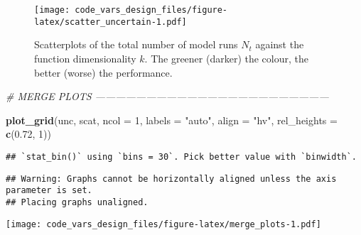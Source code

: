 \documentclass[11pt,]{article}
\newenvironment{Shaded}{\begin{snugshade}}{\end{snugshade}}
\newcommand{\CommentTok}[1]{\textcolor[rgb]{0.56,0.35,0.01}{\textit{#1}}}
\newcommand{\DataTypeTok}[1]{\textcolor[rgb]{0.13,0.29,0.53}{#1}}
\newcommand{\DecValTok}[1]{\textcolor[rgb]{0.00,0.00,0.81}{#1}}
\newcommand{\FloatTok}[1]{\textcolor[rgb]{0.00,0.00,0.81}{#1}}
\newcommand{\KeywordTok}[1]{\textcolor[rgb]{0.13,0.29,0.53}{\textbf{#1}}}
\newcommand{\NormalTok}[1]{#1}
\newcommand{\StringTok}[1]{\textcolor[rgb]{0.31,0.60,0.02}{#1}}
\begin{document}
\begin{figure}
\centering
\texttt{[image: code\_vars\_design\_files/figure-latex/scatter\_uncertain-1.pdf]}
\caption{Scatterplots of the total number of model runs \(N_t\) against
the function dimensionality \(k\). The greener (darker) the colour, the
better (worse) the performance.}
\end{figure}

\begin{Shaded}
\begin{Highlighting}[]
\CommentTok{# MERGE PLOTS ---------------------------------------------------------------------}
 
\KeywordTok{plot_grid}\NormalTok{(unc, scat, }\DataTypeTok{ncol =} \DecValTok{1}\NormalTok{, }\DataTypeTok{labels =} \StringTok{"auto"}\NormalTok{, }\DataTypeTok{align =} \StringTok{"hv"}\NormalTok{, }
          \DataTypeTok{rel_heights =} \KeywordTok{c}\NormalTok{(}\FloatTok{0.72}\NormalTok{, }\DecValTok{1}\NormalTok{))}
\end{Highlighting}
\end{Shaded}

\begin{verbatim}
## `stat_bin()` using `bins = 30`. Pick better value with `binwidth`.
\end{verbatim}

\begin{verbatim}
## Warning: Graphs cannot be horizontally aligned unless the axis parameter is set.
## Placing graphs unaligned.
\end{verbatim}

\texttt{[image: code\_vars\_design\_files/figure-latex/merge\_plots-1.pdf]}
\end{document}
